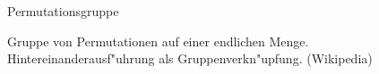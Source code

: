 \documentclass[class=article, crop=false]{standalone}
\begin{document}
\begin{zettel}{Permutationsgruppe}
\begin{flashcard}[]{}
	Gruppe von Permutationen auf einer endlichen Menge. Hintereinanderausf"uhrung als Gruppenverkn"upfung. (Wikipedia)
\end{flashcard}
\end{zettel}
\end{document}
